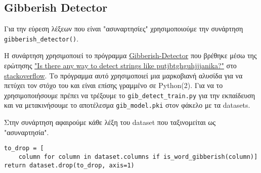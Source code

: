 \subsection{Gibberish Detector}
\sloppy Για την εύρεση λέξεων που είναι "ασυναρτησίες" χρησιμοποιούμε την συνάρτηση
\lstinline!gibberish_detector()!.

Η συνάρτηση χρησιμοποιεί το πρόγραμμα \href{https://github.com/rrenaud/Gibberish-Detector}{Gibberish-Detector}
που βρέθηκε μέσω της ερώτησης \href{http://stackoverflow.com/a/6298193/3430986}{"Is there any way to detect strings like putjbtghguhjjjanika?"}
στο \href{stackoverflow.com}{stackoverflow}.
Το πρόγραμμα αυτό χρησιμοποιεί μια μαρκοβιανή αλυσίδα για να πετύχει τον στόχο του και είναι επίσης γραμμένο σε Python(2).
Για να το χρησιμοποιήσουμε πρέπει να τρέξουμε το \texttt{gib\_detect\_train.py} για την εκπαίδευση
και να μετακινήσουμε το αποτέλεσμα \texttt{gib\_model.pki} στον φάκελο με τα datasets.

Στην συνάρτηση αφαιρούμε κάθε λέξη του dataset που ταξινομείται ως "ασυναρτησία".
\begin{lstlisting}[captionpos=none, numbers=none, breaklines=true]
to_drop = [
    column for column in dataset.columns if is_word_gibberish(column)]
return dataset.drop(to_drop, axis=1)
\end{lstlisting}
